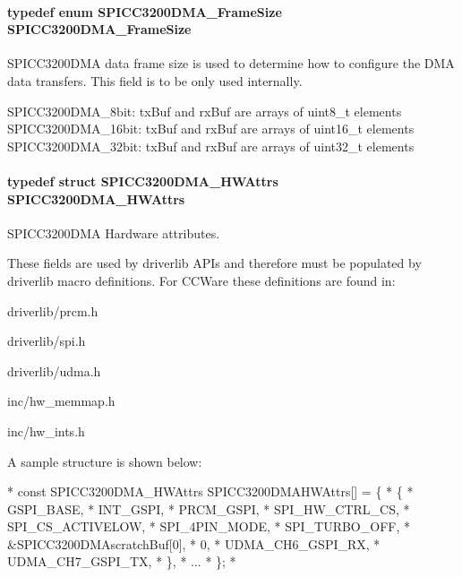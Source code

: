 \paragraph[{S\-P\-I\-C\-C3200\-D\-M\-A\-\_\-\-Frame\-Size}]{\setlength{\rightskip}{0pt plus 5cm}typedef enum {\bf S\-P\-I\-C\-C3200\-D\-M\-A\-\_\-\-Frame\-Size}  {\bf S\-P\-I\-C\-C3200\-D\-M\-A\-\_\-\-Frame\-Size}}\label{_s_p_i_c_c3200_d_m_a_8h_ad45a7b86b506d187ac96bc24d0475cd6}


S\-P\-I\-C\-C3200\-D\-M\-A data frame size is used to determine how to configure the D\-M\-A data transfers. This field is to be only used internally. 

S\-P\-I\-C\-C3200\-D\-M\-A\-\_\-8bit\-: tx\-Buf and rx\-Buf are arrays of uint8\-\_\-t elements S\-P\-I\-C\-C3200\-D\-M\-A\-\_\-16bit\-: tx\-Buf and rx\-Buf are arrays of uint16\-\_\-t elements S\-P\-I\-C\-C3200\-D\-M\-A\-\_\-32bit\-: tx\-Buf and rx\-Buf are arrays of uint32\-\_\-t elements 
\paragraph[{S\-P\-I\-C\-C3200\-D\-M\-A\-\_\-\-H\-W\-Attrs}]{\setlength{\rightskip}{0pt plus 5cm}typedef struct {\bf S\-P\-I\-C\-C3200\-D\-M\-A\-\_\-\-H\-W\-Attrs}  {\bf S\-P\-I\-C\-C3200\-D\-M\-A\-\_\-\-H\-W\-Attrs}}\label{_s_p_i_c_c3200_d_m_a_8h_a62f07fdc6837972d70b05231fc3b3501}


S\-P\-I\-C\-C3200\-D\-M\-A Hardware attributes. 

These fields are used by driverlib A\-P\-Is and therefore must be populated by driverlib macro definitions. For C\-C\-Ware these definitions are found in\-:
\begin{DoxyItemize}
\item driverlib/prcm.\-h
\item driverlib/spi.\-h
\item driverlib/udma.\-h
\item inc/hw\-\_\-memmap.\-h
\item inc/hw\-\_\-ints.\-h
\end{DoxyItemize}

A sample structure is shown below\-: 
\begin{DoxyCode}
*  \textcolor{keyword}{const} SPICC3200DMA_HWAttrs SPICC3200DMAHWAttrs[] = \{
*      \{
*          GSPI\_BASE,
*          INT\_GSPI,
*          PRCM\_GSPI,
*          SPI\_HW\_CTRL\_CS,
*          SPI\_CS\_ACTIVELOW,
*          SPI\_4PIN\_MODE,
*          SPI\_TURBO\_OFF,
*          &SPICC3200DMAscratchBuf[0],
*          0,
*          UDMA\_CH6\_GSPI\_RX,
*          UDMA\_CH7\_GSPI\_TX,
*      \},
*      ...
*  \};
*  
\end{DoxyCode}
